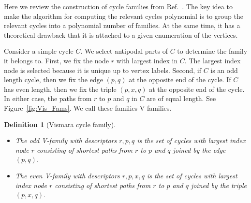\documentclass[fleqn,11pt]{article}
\newtheorem{definition}{Definition}
\begin{document}

Here we review the construction of cycle families from Ref.~\cite{vismaraUnion1997}. 
The key idea to make the algorithm for computing the relevant cycles polynomial is to group the relevant cycles into a polynomial number of families.
%
At the same time, it has a theoretical drawback that it is attached to a given enumeration of the vertices.

Consider a simple cycle $C$. We select antipodal parts of $C$ to determine the family it belongs to.
First, we fix the node $r$ with largest index in $C$. The largest index node is selected because it is unique up to vertex labels. Second, if $C$ is an odd length cycle, then we fix the edge $(p,q)$ at the opposite end of the cycle. If $C$ has even length, then we fix the triple $(p,x,q)$ at the opposite end of the cycle. In either case, the paths from $r$ to $p$ and $q$ in $C$ are of equal length. See Figure~\ref{fig:Vis_Fams}. We call these families V-families. %

\begin{definition}[Vismara cycle family]\phantom{.}
	
	\begin{itemize}
		\item The odd V-family with descriptors $r,p,q$ is the set of cycles with largest index node $r$ consisting of shortest paths from $r$ to $p$ and $q$ joined by the edge $(p,q)$.
		
		\item The even V-family with descriptors $r,p,x,q$ is the set of cycles with largest index node $r$ consisting of shortest paths from $r$ to $p$ and $q$ joined by the triple $(p,x,q)$.
	\end{itemize}
	
	
	
	
	\label{def:vis_fam}%
\end{definition}
\end{document}

